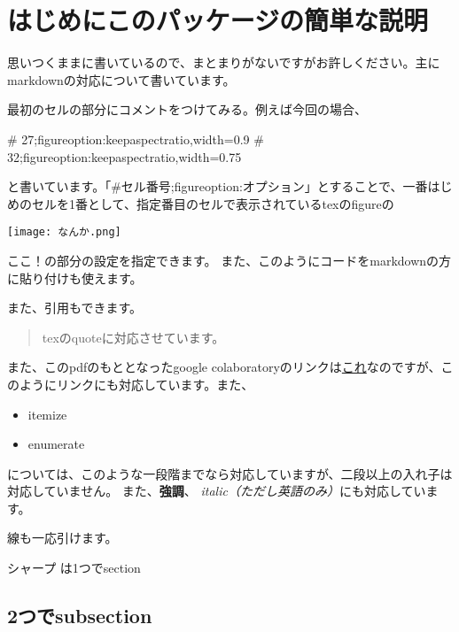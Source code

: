 \section{はじめにこのパッケージの簡単な説明}
\par 思いつくままに書いているので、まとまりがないですがお許しください。主にmarkdownの対応について書いています。
\par 最初のセルの部分にコメントをつけてみる。例えば今回の場合、
\begin{markdownCodeCell}[escapechar=~]
# 27;figureoption:keepaspectratio,width=0.9\hsize
# 32;figureoption:keepaspectratio,width=0.75\hsize

\end{markdownCodeCell}\par と書いています。「\#セル番号;figureoption:オプション」とすることで、一番はじめのセルを1番として、指定番目のセルで表示されているtexのfigureの
\begin{markdownCodeCell}[escapechar=~]
\texttt{[image: なんか.png]}

\end{markdownCodeCell}\par ここ！の部分の設定を指定できます。
また、このようにコードをmarkdownの方に貼り付けも使えます。
\par また、引用もできます。
\begin{quote}

texのquoteに対応させています。

\end{quote}
\par また、このpdfのもととなったgoogle colaboratoryのリンクは\href{https://colab.research.google.com/drive/1ciNys02sU0IC8EuUC5A0\_y13wfQda-7k}{これ}なのですが、このようにリンクにも対応しています。また、
\begin{itemize}

\item itemize
\item enumerate

\end{itemize}
\par については、このような一段階までなら対応していますが、二段以上の入れ子は対応していません。
また、\textbf{強調}、 \textit{italic（ただし英語のみ）}にも対応しています。

\hrulefill

\par 線も一応引けます。
\par シャープ は1つでsection
\subsection{2つでsubsection}
